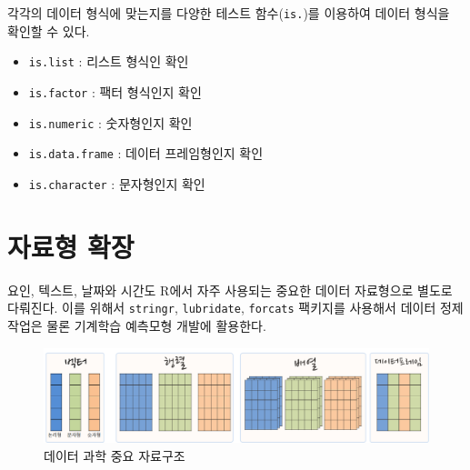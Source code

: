 \documentclass[
  letterpaper,
]{book}
\providecommand{\tightlist}{%
  \setlength{\itemsep}{0pt}\setlength{\parskip}{0pt}}\usepackage{longtable,booktabs,array}
\begin{document}
\begin{tcolorbox}[enhanced jigsaw, coltitle=black, breakable, opacityback=0, colback=white, bottomtitle=1mm, titlerule=0mm, toptitle=1mm, title=\textcolor{quarto-callout-note-color}{\faInfo}\hspace{0.5em}{자료형 확인}, left=2mm, rightrule=.15mm, colframe=quarto-callout-note-color-frame, bottomrule=.15mm, leftrule=.75mm, toprule=.15mm, arc=.35mm, colbacktitle=quarto-callout-note-color!10!white, opacitybacktitle=0.6]

각각의 데이터 형식에 맞는지를 다양한 테스트 함수(\texttt{is.})를
이용하여 데이터 형식을 확인할 수 있다.

\begin{itemize}
\tightlist
\item
  \texttt{is.list} : 리스트 형식인 확인
\item
  \texttt{is.factor} : 팩터 형식인지 확인
\item
  \texttt{is.numeric} : 숫자형인지 확인
\item
  \texttt{is.data.frame} : 데이터 프레임형인지 확인
\item
  \texttt{is.character} : 문자형인지 확인
\end{itemize}

\end{tcolorbox}

\section{자료형 확장}\label{extended-data-type}

요인, 텍스트, 날짜와 시간도 R에서 자주 사용되는 중요한 데이터 자료형으로
별도로 다뤄진다. 이를 위해서 \texttt{stringr}, \texttt{lubridate},
\texttt{forcats} 팩키지를 사용해서 데이터 정제 작업은 물론 기계학습
예측모형 개발에 활용한다.

\begin{figure}[H]

{\centering \includegraphics{images/ds-data-structure-pictogram.png}

}

\caption{데이터 과학 중요 자료구조}

\end{figure}%
\end{document}
